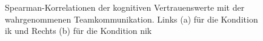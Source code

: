 \documentclass[a4paper,11pt]{article}%
\renewcommand{\\}{\vspace*{0.5\baselineskip} \newline}
\begin{document}
\begin{figure}[h]
  \centering
  \qquad
  \caption[Spearman-Korrelationen kog. Vertrauen NIK und Teamkommunikation NIK]{Spearman-Korrelationen der kognitiven Vertrauenswerte mit der wahrgenommenen Teamkommunikation. Links (a) für die Kondition \ac{ik} und Rechts (b) für die Kondition \ac{nik}}
  \label{SubSig2}
\end{figure}
\clearpage
\newpage
\end{document}
